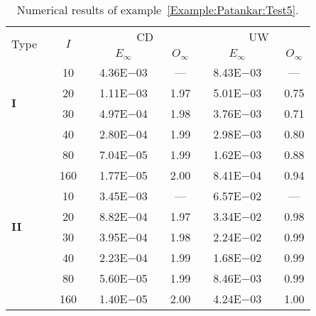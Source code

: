 {\renewcommand{\baselinestretch}{1.0}
\begin{table}[H]
\caption{Numerical results of example~\ref{Example:Patankar:Test5}.}

\setlength{\tabcolsep}{5pt}
\centering
\begin{tabular}{@{}l c c c c c c c c c c@{}}
\toprule
\multirow{2}{*}{Type} &  & \multirow{2}{*}{$I$} &  & \multicolumn{3}{c}{CD} &  & \multicolumn{3}{c}{UW} \\
\cline{5-7}
\cline{9-11}
 & & & & $E_{\infty}$ & & $O_{\infty}$ & & $E_{\infty}$ & & $O_{\infty}$\\
\midrule
\multirow{4}{*}{\textbf{I}} 
 & & 10 & & 4.36E$-$03 & & --- & & 8.43E$-$03 & & ---\\
 & & 20 & & 1.11E$-$03 & & 1.97 & & 5.01E$-$03 & & 0.75\\
 & & 30 & & 4.97E$-$04 & & 1.98 & & 3.76E$-$03 & & 0.71\\
 & & 40 & & 2.80E$-$04 & & 1.99 & & 2.98E$-$03 & & 0.80\\
 & & 80 & & 7.04E$-$05 & & 1.99 & & 1.62E$-$03 & & 0.88\\
 & & 160 & & 1.77E$-$05 & & 2.00 & & 8.41E$-$04 & & 0.94\\
\midrule
\multirow{4}{*}{\textbf{II}} 
 & & 10 & & 3.45E$-$03 & & --- & & 6.57E$-$02 & & ---\\
 & & 20 & & 8.82E$-$04 & & 1.97 & & 3.34E$-$02 & & 0.98\\
 & & 30 & & 3.95E$-$04 & & 1.98 & & 2.24E$-$02 & & 0.99\\
 & & 40 & & 2.23E$-$04 & & 1.99 & & 1.68E$-$02 & & 0.99\\
 & & 80 & & 5.60E$-$05 & & 1.99 & & 8.46E$-$03 & & 0.99\\
 & & 160 & & 1.40E$-$05 & & 2.00 & & 4.24E$-$03 & & 1.00\\
\bottomrule
\end{tabular}
\label{Table:Patankar:Test5}
\end{table}}
